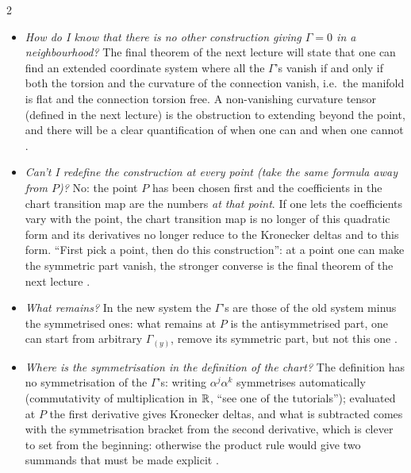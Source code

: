 \begin{paracol}{2}
\begin{coursenote}
\begin{itemize}
  \item \emph{How do I know that there is no other construction giving $\Gamma=0$ in a neighbourhood?} The final theorem of the next lecture will state that one can find an extended coordinate system where all the $\Gamma$'s vanish if and only if both the torsion and the curvature of the connection vanish, i.e.\ the manifold is flat and the connection torsion free. A non-vanishing curvature tensor (defined in the next lecture) is the obstruction to extending beyond the point, and there will be a clear quantification of when one can and when one cannot .
  \item \emph{Can't I redefine the construction at every point (take the same formula away from $P$)?} No: the point $P$ has been chosen first and the coefficients in the chart transition map are the numbers \emph{at that point}. If one lets the coefficients vary with the point, the chart transition map is no longer of this quadratic form and its derivatives no longer reduce to the Kronecker deltas and to this form. ``First pick a point, then do this construction'': at a point one can make the symmetric part vanish, the stronger converse is the final theorem of the next lecture .
  \item \emph{What remains?} In the new system the $\Gamma$'s are those of the old system minus the symmetrised ones: what remains at $P$ is the antisymmetrised part, one can start from arbitrary $\Gamma_{(y)}$, remove its symmetric part, but not this one .
  \item \emph{Where is the symmetrisation in the definition of the chart?} The definition has no symmetrisation of the $\Gamma$'s: writing $\alpha^j\alpha^k$ symmetrises automatically (commutativity of multiplication in $\mathbb{R}$, ``see one of the tutorials''); evaluated at $P$ the first derivative gives Kronecker deltas, and what is subtracted comes with the symmetrisation bracket from the second derivative, which is clever to set from the beginning: otherwise the product rule would give two summands that must be made explicit .
\end{itemize}
\end{coursenote}


\end{paracol}
